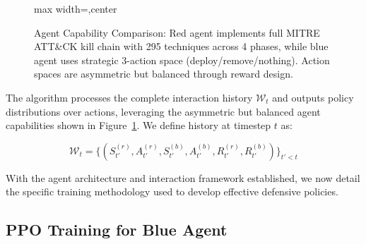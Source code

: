 \documentclass[12pt,oneside]{article}
\begin{document}
\begin{figure}[H]
\begin{adjustbox}{max width=\linewidth,center}
\end{adjustbox}
\caption{Agent Capability Comparison: Red agent implements full MITRE ATT\&CK kill chain with 295 techniques across 4 phases, while blue agent uses strategic 3-action space (deploy/remove/nothing). Action spaces are asymmetric but balanced through reward design.}
\label{fig:agent_capabilities}
\end{figure}

The algorithm processes the complete interaction history $\mathcal{W}_t$ and outputs policy distributions over actions, leveraging the asymmetric but balanced agent capabilities shown in Figure~\ref{fig:agent_capabilities}. We define history at timestep $t$ as:

\begin{equation}
\mathcal{W}_t = \{(S_{t'}^{(r)}, A_{t'}^{(r)}, S_{t'}^{(b)}, A_{t'}^{(b)}, R_{t'}^{(r)}, R_{t'}^{(b)})\}_{t' < t}
\end{equation}

With the agent architecture and interaction framework established, we now detail the specific training methodology used to develop effective defensive policies.

\subsection{PPO Training for Blue Agent}
\end{document}
